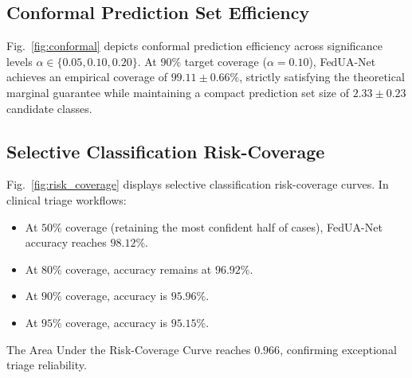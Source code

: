 \documentclass[journal]{IEEEtran}
\begin{document}
\subsection{Conformal Prediction Set Efficiency}
Fig.~\ref{fig:conformal} depicts conformal prediction efficiency across significance levels $\alpha \in \{0.05, 0.10, 0.20\}$. At $90\%$ target coverage ($\alpha=0.10$), FedUA-Net achieves an empirical coverage of \textbf{$99.11 \pm 0.66\%$}, strictly satisfying the theoretical marginal guarantee while maintaining a compact prediction set size of \textbf{$2.33 \pm 0.23$} candidate classes.

\subsection{Selective Classification Risk-Coverage}
Fig.~\ref{fig:risk_coverage} displays selective classification risk-coverage curves. In clinical triage workflows:
\begin{itemize}
    \item At $50\%$ coverage (retaining the most confident half of cases), FedUA-Net accuracy reaches \textbf{$98.12\%$}.
    \item At $80\%$ coverage, accuracy remains at \textbf{$96.92\%$}.
    \item At $90\%$ coverage, accuracy is \textbf{$95.96\%$}.
    \item At $95\%$ coverage, accuracy is \textbf{$95.15\%$}.
\end{itemize}
The Area Under the Risk-Coverage Curve reaches \textbf{$0.966$}, confirming exceptional triage reliability.
\end{document}
